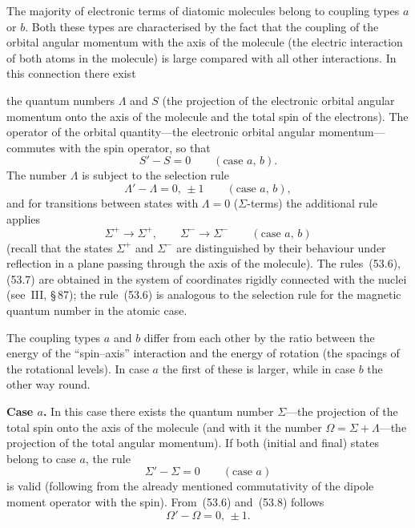 The majority of electronic terms of diatomic molecules belong to coupling types $a$ or $b$. Both these types are characterised by the fact that the coupling of the orbital angular momentum with the axis of the molecule (the electric interaction of both atoms in the molecule) is large compared with all other interactions. In this connection there exist

the quantum numbers $\Lambda$ and $S$ (the projection of the electronic orbital angular momentum onto the axis of the molecule and the total spin of the electrons). The operator of the orbital quantity---the electronic orbital angular momentum---commutes with the spin operator, so that
\begin{equation}
S' - S = 0\qquad (\text{case } a,\,b).
\tag{53.5}
\end{equation}
The number $\Lambda$ is subject to the selection rule
\begin{equation}
\Lambda' - \Lambda = 0,\,\pm 1\qquad (\text{case } a,\,b),
\tag{53.6}
\end{equation}
and for transitions between states with $\Lambda = 0$ ($\Sigma$-terms) the additional rule applies
\begin{equation}
\Sigma^+ \to \Sigma^+,\qquad \Sigma^- \to \Sigma^-\qquad (\text{case } a,\,b)
\tag{53.7}
\end{equation}
(recall that the states $\Sigma^+$ and $\Sigma^-$ are distinguished by their behaviour under reflection in a plane passing through the axis of the molecule). The rules~(53.6), (53.7) are obtained in the system of coordinates rigidly connected with the nuclei (see~III, \S\,87); the rule~(53.6) is analogous to the selection rule for the magnetic quantum number in the atomic case.

The coupling types $a$ and $b$ differ from each other by the ratio between the energy of the ``spin--axis'' interaction and the energy of rotation (the spacings of the rotational levels). In case $a$ the first of these is larger, while in case $b$ the other way round.

\textbf{Case $a$.} In this case there exists the quantum number $\Sigma$---the projection of the total spin onto the axis of the molecule (and with it the number $\Omega = \Sigma + \Lambda$---the projection of the total angular momentum). If both (initial and final) states belong to case $a$, the rule
\begin{equation}
\Sigma' - \Sigma = 0\qquad (\text{case } a)
\tag{53.8}
\end{equation}
is valid (following from the already mentioned commutativity of the dipole moment operator with the spin). From~(53.6) and~(53.8) follows
\begin{equation}
\Omega' - \Omega = 0,\,\pm 1.
\tag{53.9}
\end{equation}

